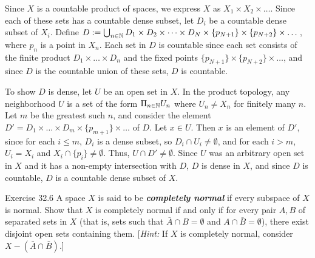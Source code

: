 \documentclass{hmwk}
\begin{document}
\begin{solution}

\pre Since $X$ is a countable product of spaces, we express $X$ as $X_1 \times X_2 \times \dots$. Since each of these sets has a countable dense subset, let $D_i$ be a countable dense subset of $X_i$. Define $D := \bigcup_{n\in\mathbb{N}} D_1 \times D_2 \times \dots \times D_N \times \{p_{N+1}\} \times \{p_{N+2}\} \times \dots$, where $p_n$ is a point in $X_n$. Each set in $D$ is countable since each set consists of the finite product $D_1 \times \dots \times D_n$ and the fixed points $\{p_{N+1}\} \times \{p_{N+2}\} \times \dots$, and since $D$ is the countable union of these sets, $D$ is countable. 

\pre To show $D$ is dense, let $U$ be an open set in $X$. In the product topology, any neighborhood $U$ is a set of the form $\Pi_{n\in\mathbb{N}} U_n$ where $U_n \neq X_n$ for finitely many $n$. Let $m$ be the greatest such $n$, and consider the element $D' = D_1 \times \dots \times D_m \times \{p_{m+1}\} \times \dots$ of $D$. Let $x \in U$. Then $x$ is an element of $D'$, since for each $i \leq m$, $D_i$ is a dense subset, so $D_i \cap U_i \neq \emptyset$, and for each $i > m$, $U_i = X_i$ and $X_i \cap \{p_i\} \neq \emptyset$. Thus, $U \cap D' \neq \emptyset$. Since $U$ was an arbitrary open set in $X$ and it has a non-empty intersection with $D$, $D$ is dense in $X$, and since $D$ is countable, $D$ is a countable dense subset of $X$. 
\end{solution}

\begin{problem}{Exercise 32.6}
    A space $X$ is said to be \textbf{\textit{completely normal}} if every subspace of $X$ is normal. Show that $X$ is completely normal if and only if for every pair $A, B$ of separated sets in $X$ (that is, sets such that $\bar{A} \cap B = \emptyset$ and $A \cap \bar{B} = \emptyset$), there exist disjoint open sets containing them. [\textit{Hint:} If $X$ is completely normal, consider $X - (\bar{A} \cap \bar{B}).$]
\end{problem}
\end{document}
